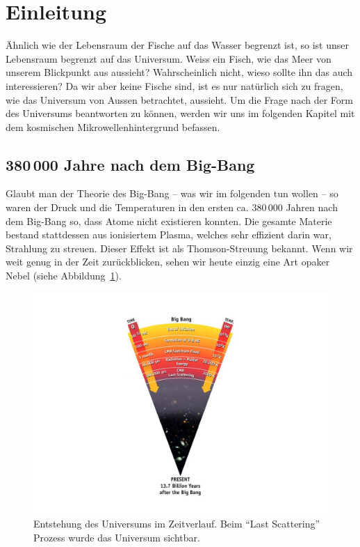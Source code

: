 \section{Einleitung}
Ähnlich wie der Lebensraum der Fische auf das Wasser begrenzt ist, so ist unser 
Lebensraum begrenzt auf das Universum.
Weiss ein Fisch, wie das Meer von unserem Blickpunkt aus aussieht?
Wahrscheinlich nicht, wieso sollte ihn das auch interessieren?
Da wir aber keine Fische sind, ist es nur natürlich sich zu fragen, wie das 
Universum von Aussen betrachtet, aussieht.
Um die Frage nach der Form des Universums beantworten zu können, werden wir uns 
im folgenden Kapitel mit dem kosmischen Mikrowellenhintergrund befassen.

\subsection{380\,000 Jahre nach dem Big-Bang}
Glaubt man der Theorie des Big-Bang -- was wir im folgenden tun wollen -- so 
waren 
der Druck und die Temperaturen in den ersten ca. 380\,000 Jahren nach dem 
Big-Bang so, dass Atome nicht existieren konnten.
Die gesamte Materie bestand stattdessen aus ionisiertem Plasma, welches sehr 
effizient darin war, Strahlung zu streuen. Dieser Effekt ist als 
Thomson-Streuung bekannt.
Wenn wir weit genug in der Zeit zurückblicken, sehen wir heute einzig eine Art 
opaker Nebel (siehe Abbildung~\ref{fig:radiation_scattering}).
\begin{figure}
	\centering
	\includegraphics[width=\linewidth]{cmb/images/radiation_scattering.jpg}
	\caption{Entstehung des Universums im Zeitverlauf. Beim ``Last Scattering'' 
	Prozess wurde das Universum sichtbar.}
	\label{fig:radiation_scattering}
\end{figure}

